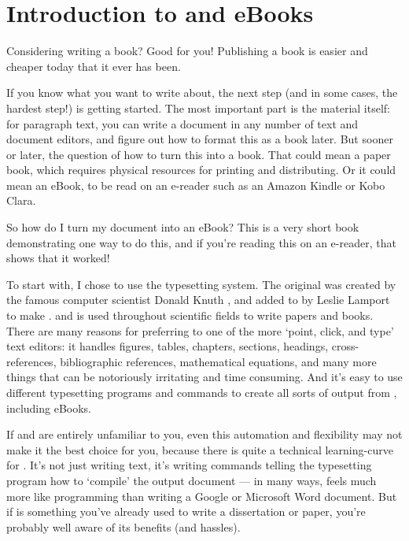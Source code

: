 
\chapter{Introduction to \latex and eBooks}

Considering writing a book? Good for you! Publishing a book is easier and cheaper today 
that it ever has been. 

If you know what you want to write about, the next step (and in some cases, the 
hardest step!) is getting started. The most important part is the material itself: 
for paragraph text, you can write a document in any number of text and document editors, 
and figure out how to format this as a book later. But sooner or later, 
the question of how to turn this into a book. That could mean a paper book, 
which requires physical resources for printing and distributing. Or it could mean
an eBook, to be read on an e-reader such as an Amazon Kindle or Kobo Clara.

So how do I turn my document into an eBook? This is a very short book demonstrating one 
way to do this, and if you're reading this on an e-reader, that shows that it worked!

To start with, I chose to use the \latex typesetting system. 
The original \tex was created by the famous computer scientist Donald Knuth \cite{knuth1984texbook}, and added to by Leslie Lamport to make \latex \cite{lamport1985i1}.
and is used throughout scientific fields to write papers and books. There are many
reasons for preferring \latex to one of the more `point, click, and type' text editors:
it handles figures, tables, chapters, sections, headings, cross-references, 
bibliographic references, mathematical equations, and many more things that can be 
notoriously irritating and time consuming. And it's easy to use different typesetting
programs and commands to create all sorts of output from \latex, including eBooks.

If \tex and \latex are entirely unfamiliar to you, even this automation and flexibility 
may not make it the best choice for you, because there is quite a technical 
learning-curve for \latex. It's not just writing text, it's writing commands telling the
typesetting program how to `compile' the output document --- in many ways, \latex
feels much more like programming than writing a Google or Microsoft Word document. But if
\latex is something you've already used to write a dissertation or paper, you're 
probably well aware of its benefits (and hassles). 

